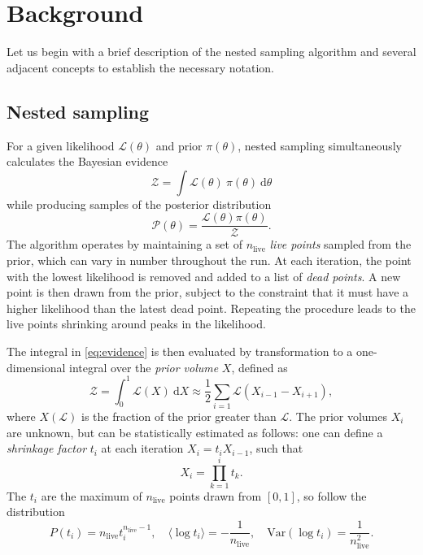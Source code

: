 \documentclass[usenatbib]{mnras}
\newcommand{\nlive}{n_\mathrm{live}}
\begin{document}
\section{Background}\label{sec:Background}
Let us begin with a brief description of the nested sampling algorithm and several adjacent concepts to establish the necessary notation. 
\subsection{Nested sampling}
For a given likelihood $\mathcal{L}(\theta)$ and prior $\pi(\theta)$, nested sampling simultaneously calculates the Bayesian evidence
\begin{equation}\label{eq:evidence}
	\mathcal{Z} = \int \mathcal{L}(\theta)\ \pi(\theta)\ \mathrm{d}\theta
\end{equation}
while producing samples of the posterior distribution
\begin{equation}
	\mathcal{P}(\theta) = \frac{\mathcal{L}(\theta) \pi(\theta)}{\mathcal{Z}}.
\end{equation}
The algorithm operates by maintaining a set of $\nlive$ \textit{live points} sampled from the prior, which can vary in number throughout the run. At each iteration, the point with the lowest likelihood is removed and added to a list of \textit{dead points}. A new point is then drawn from the prior, subject to the constraint that it must have a higher likelihood than the latest dead point. Repeating the procedure leads to the live points shrinking around peaks in the likelihood.
\par
The integral in \cref{eq:evidence} is then evaluated by transformation to a one-dimensional integral over the \textit{prior volume} $X$, defined as
\begin{equation}
	\mathcal{Z} = \int_0^1 \mathcal{L}(X)\ \mathrm{d}X \approx \frac{1}{2}\sum_{i=1} \mathcal{L}(X_{i-1}-X_{i+1}),
\end{equation}
where $X(\mathcal{L})$ is the fraction of the prior greater than $\mathcal{L}$. The prior volumes $X_i$ are unknown, but can be statistically estimated as follows: one can define a \textit{shrinkage factor} $t_i$ at each iteration $X_{i} = t_i X_{i-1}$, such that
\begin{equation}\label{eq:X_dist}
	X_i = \prod_{k=1}^i t_k.
\end{equation}
The $t_i$ are the maximum of $\nlive$ points drawn from $[0,1]$, so follow the distribution
\begin{equation}\label{eq:t_dist}
	P(t_i) = \nlive t_i^{\nlive-1}, \quad \langle\log t_i\rangle = -\frac{1}{\nlive}, \quad \mathrm{Var}(\log t_i) = \frac{1}{\nlive^2}.
\end{equation}
\end{document}

